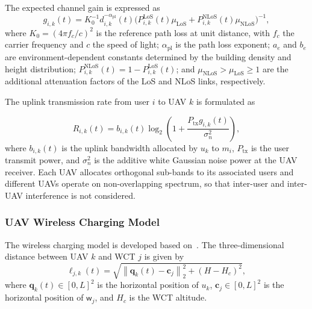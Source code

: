 \documentclass[journal]{IEEEtran}
\begin{document}
The expected channel gain is expressed as
\begin{equation}\label{eq:channel}
g_{i,k}(t) = K_0^{-1} d_{i,k}^{-\alpha_{\mathrm{pl}}}(t) \bigl(P_{i,k}^{\mathrm{LoS}}(t) \mu_{\mathrm{LoS}} + P_{i,k}^{\mathrm{NLoS}}(t) \mu_{\mathrm{NLoS}}\bigr)^{-1},
\end{equation}
where $K_0=(4\pi f_c/c)^{2}$ is the reference path loss at unit distance, with
$f_c$ the carrier frequency and $c$ the speed of light; $\alpha_{\mathrm{pl}}$
is the path loss exponent; $a_e$ and $b_e$ are environment-dependent constants
determined by the building density and height distribution;
$P^{\mathrm{NLoS}}_{i,k}(t)=1-P^{\mathrm{LoS}}_{i,k}(t)$; and
$\mu_{\mathrm{NLoS}}>\mu_{\mathrm{LoS}}\ge 1$ are the additional attenuation
factors of the LoS and NLoS links, respectively.

The uplink transmission rate from user $i$ to UAV $k$ is formulated as

\begin{equation}\label{eq:rate}
R_{i,k}(t) = b_{i,k}(t) \log_2\left(1 + \frac{P_{\mathrm{tx}} g_{i,k}(t)}{\sigma_n^{2}}\right),
\end{equation}
where $b_{i,k}(t)$ is the uplink bandwidth allocated by $u_k$ to $m_i$,
$P_{\mathrm{tx}}$ is the user transmit power, and $\sigma_n^{2}$ is the additive white Gaussian noise power at the UAV receiver. Each UAV allocates orthogonal
sub-bands to its associated users and different UAVs operate on non-overlapping
spectrum, so that inter-user and inter-UAV interference is not considered.

\subsubsection{UAV Wireless Charging Model}

The wireless charging model is developed based on~\cite{xu2018uav}. The three-dimensional distance between UAV $k$ and WCT $j$ is given by
\begin{equation}\label{eq:distwct}
\ell_{j,k}(t)=\sqrt{\left\|\bm q_k(t)-\bm c_j\right\|_2^{2}+(H-H_c)^{2}},
\end{equation}
where $\bm q_k(t)\in[0,L]^2$ is the horizontal position of $u_k$,
$\bm c_j\in[0,L]^2$ is the horizontal position of $\mathsf{w}_j$, and $H_c$ is
the WCT altitude.
\end{document}
